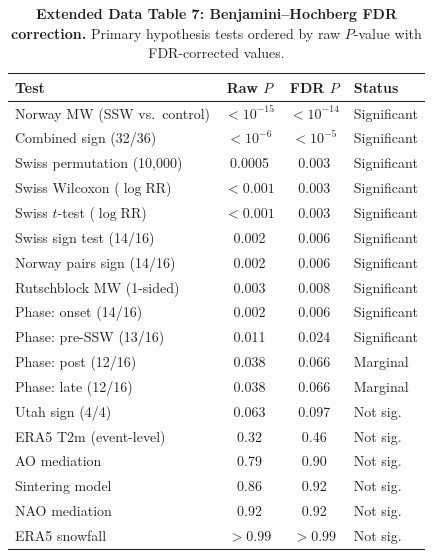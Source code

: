 \documentclass[11pt,letterpaper]{article}
\begin{document}
\begin{table}[!ht]
\centering
\caption{\textbf{Extended Data Table 7: Benjamini--Hochberg FDR correction.}
Primary hypothesis tests ordered by raw $P$-value with FDR-corrected values.}
\label{tab:fdr}
\small
\begin{tabular}{lccl}
\toprule
Test & Raw $P$ & FDR $P$ & Status \\
\midrule
Norway MW (SSW vs.\ control) & $< 10^{-15}$ & $< 10^{-14}$ & Significant \\
Combined sign (32/36) & $< 10^{-6}$ & $< 10^{-5}$ & Significant \\
Swiss permutation (10,000) & 0.0005 & 0.003 & Significant \\
Swiss Wilcoxon ($\log$RR) & $< 0.001$ & 0.003 & Significant \\
Swiss $t$-test ($\log$RR) & $< 0.001$ & 0.003 & Significant \\
Swiss sign test (14/16) & 0.002 & 0.006 & Significant \\
Norway pairs sign (14/16) & 0.002 & 0.006 & Significant \\
Rutschblock MW (1-sided) & 0.003 & 0.008 & Significant \\
Phase: onset (14/16) & 0.002 & 0.006 & Significant \\
Phase: pre-SSW (13/16) & 0.011 & 0.024 & Significant \\
Phase: post (12/16) & 0.038 & 0.066 & Marginal \\
Phase: late (12/16) & 0.038 & 0.066 & Marginal \\
Utah sign (4/4) & 0.063 & 0.097 & Not sig. \\
ERA5 T2m (event-level) & 0.32 & 0.46 & Not sig. \\
AO mediation & 0.79 & 0.90 & Not sig. \\
Sintering model & 0.86 & 0.92 & Not sig. \\
NAO mediation & 0.92 & 0.92 & Not sig. \\
ERA5 snowfall & $> 0.99$ & $> 0.99$ & Not sig. \\
\bottomrule
\end{tabular}
\end{table}
\end{document}

